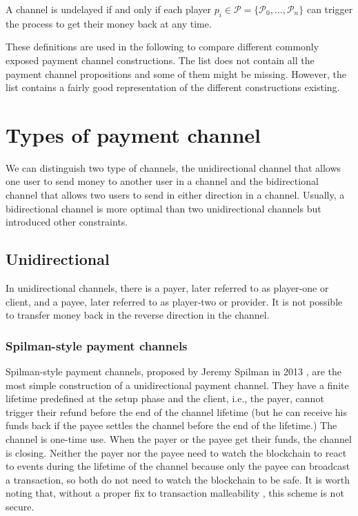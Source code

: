 \begin{definition}[Undelayed]
  A channel is undelayed if and only if each player $p_i \in \mathcal{P} = \{\mathcal{P}_0,
  \dots, \mathcal{P}_n\}$ can trigger the process to get their money back at any time.
\end{definition}

These definitions are used in the following to compare different commonly
exposed payment channel constructions. The list does not
contain all the payment channel propositions and some of them might be missing.
However, the list contains a fairly good representation of the different constructions
existing.

\minitoc

\newpage

\section{Types of payment channel}

We can distinguish two type of channels, the unidirectional channel that allows
one user to send money to another user in a channel and the bidirectional
channel that allows two users to send in either direction in a channel. Usually, a
bidirectional channel is more optimal than two unidirectional channels but
introduced other constraints.

\subsection{Unidirectional}

In unidirectional channels, there is a payer, later referred to as player-one or
client, and a payee, later referred to as player-two or provider.  It is not
possible to transfer money back in the reverse direction in the channel.

\subsubsection{Spilman-style payment channels}

Spilman-style payment channels, proposed by Jeremy Spilman in 2013
\cite{SpilmanStyle}, are the most simple construction of a unidirectional
payment channel. They have a finite lifetime predefined at the setup phase and
the client, i.e., the payer, cannot trigger their refund before the end of the
channel lifetime (but he can receive his funds back if the payee settles the
channel before the end of the lifetime.) The channel is one-time use. When the
payer or the payee get their funds, the channel is closing. Neither the payer nor the
payee need to watch the blockchain to react to events during the lifetime of
the channel because only the payee can broadcast a transaction, so both do not
need to watch the blockchain to be safe. It is worth noting that, without a
proper fix to transaction malleability \cite{SegWitBIP, BIP62,
DBLP:journals/corr/AndrychowiczDMM13, DBLP:journals/corr/DeckerW14}, this scheme
is not secure.

